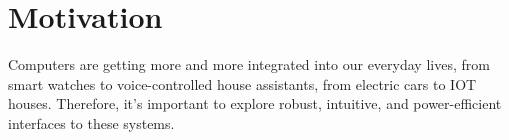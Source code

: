\section{Motivation}
\label{section: introduction - motivation}

Computers are getting more and more integrated into our everyday lives, from smart watches to voice-controlled house assistants, from electric cars to IOT houses.
Therefore, it's important to explore robust, intuitive, and power-efficient interfaces to these systems.